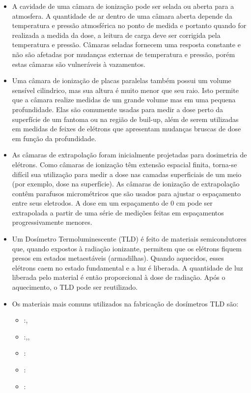 \documentclass[11pt,a4paper]{article}
\newcounter{exemplo}
\begin{document}
\begin{exemplo}
\begin{itemize}
        \item A cavidade de uma câmara de ionização pode ser selada ou aberta para a atmosfera. A quantidade de ar dentro de uma câmara aberta depende da temperatura e pressão atmosférica no ponto de medida e portanto quando for realizada a medida da dose, a leitura de carga deve ser corrigida pela temperatura e pressão. Câmaras seladas fornecem uma resposta constante e não são afetadas por mudanças externas de temperatura e pressão, porém estas câmaras são vulneráveis à vazamentos.
        
        \item Uma câmara de ionização de placas paralelas também possui um volume sensível cilindrico, mas sua altura é muito menor que seu raio. Isto permite que a câmara realize medidas de um grande volume mas em uma pequena profundidade. Elas são comumente usadas para medir a dose perto da superfície de um fantoma ou na região de buil-up, além de serem utilizadas em medidas de feixes de elétrons que apresentam mudanças bruscas de dose em função da profundidade.
        
        \item As câmaras de extrapolação foram inicialmente projetadas para dosimetria de elétrons. Como câmaras de ionização têm extensão espacial finita, torna-se difícil sua utilização para medir a dose nas camadas superficiais de um meio (por exemplo, dose na superfície). As câmaras de ionização de extrapolação contêm parafusos micrométricos que são usados para ajustar o espaçamento entre seus eletrodos. A dose em um espaçamento de 0 cm pode ser extrapolada a partir de uma série de medições feitas em espaçamentos progressivamente menores. 
        
        \item Um Dosímetro Termoluminescente (TLD) é feito de materiais semicondutores que, quando expostos à radiação ionizante, permitem que os elétrons fiquem presos em estados metaestáveis (armadilhas). Quando aquecidos, esses elétrons caem no estado fundamental e a luz é liberada. A quantidade de luz liberada pelo material é então proporcional à dose de radiação. Após o aquecimento, o TLD pode ser reutilizado.
        
        \item Os materiais mais comuns utilizados na fabricação de dosímetros TLD são: 
        
            \begin{itemize}[label=\textopenbullet]
                \item {}:,
                \item {}:,,
                \item {}:
                \item {}:
                \item {}:
            \end{itemize}
                

\end{itemize}
\end{exemplo}
\end{document}
